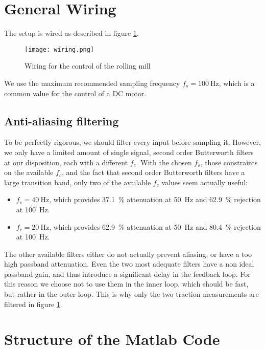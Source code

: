 \section{General Wiring}
The setup is wired as described in figure \ref{fig:wiring}.
\begin{figure}[htbp]
\centering
\texttt{[image: wiring.png]}
\caption{\label{fig:wiring}Wiring for the control of the rolling mill}
\end{figure}
We use the maximum recommended sampling frequency $f_s  = \SI{100}{\hertz}$, which is a common value for the control of a DC motor.

\subsection{Anti-aliasing filtering}
To be perfectly rigorous, we should filter every input before sampling it. However, we only have a limited amount of single signal, second order Butterworth filters at our disposition, each with a different $f_c$. With the chosen $f_s$, those constraints on the available $f_c$, and the fact that second order Butterworth filters have a large transition band, only two of the available $f_c$ values seem actually useful:
\begin{itemize}
 \item $f_c = \SI{40}{\hertz}$, which provides \SI{37.1}{\percent} attenuation at \SI{50}{\hertz} and \SI{62.9}{\percent} rejection at \SI{100}{\hertz}.
 \item $f_c = \SI{20}{\hertz}$, which provides \SI{62.9}{\percent} attenuation at \SI{50}{\hertz} and \SI{80.4}{\percent} rejection at \SI{100}{\hertz}.
\end{itemize}

The other available filters either do not actually prevent aliasing, or have a too high passband attenuation. Even the two most adequate filters have a non ideal passband gain, and thus introduce a significant delay in the feedback loop. For this reason we choose not to use them in the inner loop, which should be fast, but rather in the outer loop. This is why only the two traction measurements are filtered in figure \ref{fig:wiring}.

\section{Structure of the Matlab Code}
